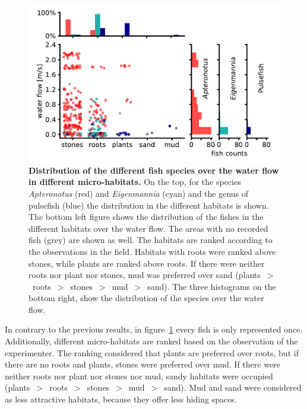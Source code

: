 \begin{figure}[H]
    \centering
    \includegraphics{pictures/Results/flow_habitat_protocol.pdf}
    \caption{\textbf{Distribution of the different fish species over the water flow in different micro-habitats.} On the top, for the species \textit{Apteronotus} (red) and \textit{Eigenmannia} (cyan) and the genus of pulsefish (blue) the distribution in the different habitats is shown. The bottom left figure shows the distribution of the fishes in the different habitats over the water flow. The areas with no recorded fish (grey) are shown as well. The habitats are ranked according to the observations in the field. Habitats with roots were ranked above stones, while plants are ranked above roots. If there were neither roots nor plant nor stones, mud was preferred over sand (plants~$>$~roots~$>$~stones~$>$~mud~$>$~sand). The three histograms on the bottom right, show the distribution of the species over the water flow.}
    \label{fig:habitat_vs_flow}
\end{figure}

In contrary to the previous results, in figure~\ref{fig:habitat_vs_flow} every fish is only represented once. Additionally, different micro-habitats are ranked based on the observation of the experimenter. The ranking considered that plants are preferred over roots, but if there are no roots and plants, stones were preferred over mud. If there were neither roots nor plant nor stones nor mud, sandy habitats were occupied (plants~$>$~roots~$>$~stones~$>$~mud~$>$~sand). Mud and sand were considered as less attractive habitats, because they offer less hiding spaces.\\

